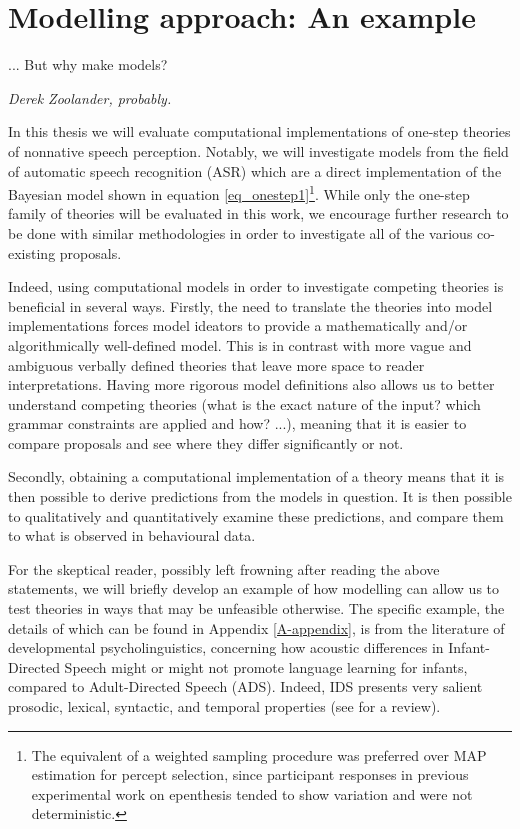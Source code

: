 \section{Modelling approach: An example}
\setlength{\epigraphwidth}{0.4\textwidth}
\epigraph{... But why make models?}{\textit{Derek Zoolander, probably.}}

In this thesis we will evaluate computational implementations of one-step theories of nonnative speech perception. Notably, we will investigate models from the field of automatic speech recognition (ASR) which are a direct implementation of the Bayesian model shown in equation \ref{eq_onestep1}\footnote{The equivalent of a weighted sampling procedure was preferred over MAP estimation for percept selection, since participant responses in previous experimental work on epenthesis tended to show variation and were not deterministic.}. 
While only the one-step family of theories will be evaluated in this work, we encourage further research to be done with similar methodologies in order to investigate all of the various co-existing proposals.

Indeed, using computational models in order to investigate competing theories is beneficial in several ways. Firstly, the need to translate the theories into model implementations forces model ideators to provide a mathematically and/or algorithmically well-defined model. This is in contrast with more vague and ambiguous verbally defined theories that leave more space to reader interpretations. Having more rigorous model definitions also allows us to better understand competing theories (what is the exact nature of the input? which grammar constraints are applied and how? ...), meaning that it is easier to compare proposals and see where they differ significantly or not. 

Secondly, obtaining a computational implementation of a theory means that it is then possible to derive predictions from the models in question. It is then possible to qualitatively and quantitatively examine these predictions, and compare them to what is observed in behavioural data.

For the skeptical reader, possibly left frowning after reading the above statements, we will briefly develop an example of how modelling can allow us to test theories in ways that may be unfeasible otherwise. The specific example, the details of which can be found in Appendix \ref{A-appendix}, is from the literature of developmental psycholinguistics, concerning how acoustic differences in Infant-Directed Speech might or might not promote language learning for infants, compared to Adult-Directed Speech (ADS). Indeed, IDS presents very salient prosodic, lexical, syntactic, and temporal properties (see \cite{soderstrom2007, golinkoff2015} for a review).

